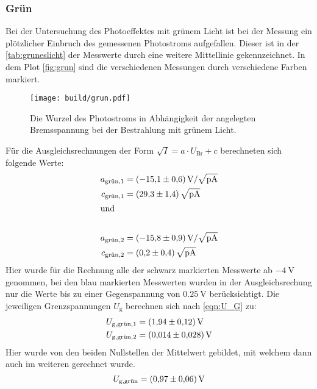 \subsubsection{Grün}
Bei der Untersuchung des Photoeffektes mit grünem Licht ist bei der Messung ein plötzlicher Einbruch des gemessenen Photostroms aufgefallen.
Dieser ist in der \autoref{tab:gruneslicht} der Messwerte durch eine weitere Mittellinie gekennzeichnet.
In dem Plot \autoref{fig:grun} sind die verschiedenen Messungen durch verschiedene Farben markiert.
\begin{figure}
  \centering
  \texttt{[image: build/grun.pdf]}
  \caption{Die Wurzel des Photostroms in Abhängigkeit der angelegten Bremsspannung bei der Bestrahlung mit grünem Licht.}
  \label{fig:grun}
\end{figure}
\noindent
Für die Ausgleichsrechnungen der Form $\sqrt{I} = a \cdot U_{\text{Br}} + c $ berechneten sich folgende Werte:
\begin{align*}
  a_{\text{grün},1} &= \SI{-15.1 \pm 0.6}{\volt\per\sqrt{\pico\ampere}}\\
  c_{\text{grün},1} &= \SI{29.3 \pm 1.4}{\sqrt{\pico\ampere}}\\
  \intertext{und}\\
  a_{\text{grün},2} &= \SI{-15.8 \pm 0.9}{\volt\per\sqrt{\pico\ampere}}\\
  c_{\text{grün},2} &= \SI{0.2 \pm 0.4}{\sqrt{\pico\ampere}}
\end{align*}
Hier wurde für die Rechnung alle der schwarz markierten Messwerte ab $\SI{-4}{\volt}$ genommen, bei den blau markierten Messwerten wurden in der Ausgleichsrechung nur die Werte bis zu einer Gegenspannung von $\SI{0.25}{\volt}$ berücksichtigt.
Die jeweiligen Grenzspannungen $U_{\text{g}}$ berechnen sich nach \eqref{eqn:U_G} zu:
\begin{align*}
  U_{\text{g},\text{grün},1} &= \SI{1.94 \pm 0.12}{\volt}\\
  U_{\text{g},\text{grün},2} &= \SI{0.014 \pm 0.028}{\volt}\\
\end{align*}
Hier wurde von den beiden Nullstellen der Mittelwert gebildet, mit welchem dann auch im weiteren gerechnet wurde.
\begin{equation*}
  U_{\text{g},\text{grün}} = \SI{0.97 \pm 0.06}{\volt}
\end{equation*}

